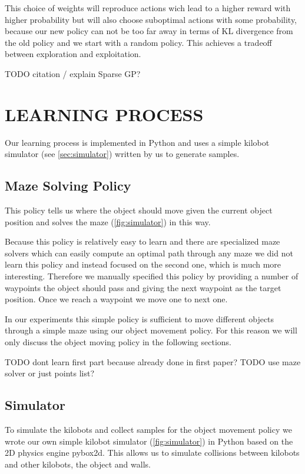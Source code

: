 \documentclass[twoside]{article}
\begin{document}
This choice of weights will reproduce actions wich lead to a higher reward with
higher probability but will also choose suboptimal actions with some
probability, because our new policy can not be too far away in terms of KL
divergence from the old policy and we start with a random policy. This achieves
a tradeoff between exploration and exploitation.

TODO citation / explain Sparse GP?

\section{LEARNING PROCESS}

Our learning process is implemented in Python and uses a simple kilobot
simulator (see \autoref{sec:simulator}) written by us to generate samples.

\subsection{Maze Solving Policy}
This policy tells us where the object should move given the current object
position and solves the maze (\autoref{fig:simulator}) in this way.

Because this policy is relatively easy to learn and there are specialized maze
solvers which can easily compute an optimal path through any maze we did not
learn this policy and instead focused on the second one, which is much more
interesting. Therefore we manually specified this policy by providing a number
of waypoints the object should pass and giving the next waypoint as the target
position. Once we reach a waypoint we move one to next one.

In our experiments this simple policy is sufficient to move different objects
through a simple maze using our object movement policy. For this reason we will
only discuss the object moving policy in the following sections.

TODO dont learn first part because already done in first paper?
TODO use maze solver or just points list?

\subsection{Simulator}
\label{sec:simulator}

\newcommand\nkb{\#\mathit{kb}}
\newcommand\nep{\#\mathit{ep}}
\newcommand\nst{\#\mathit{st}}

To simulate the kilobots and collect samples for the object movement policy we
wrote our own simple kilobot simulator (\autoref{fig:simulator}) in Python based
on the 2D physics engine pybox2d\cite{pybox2d}. This allows us to simulate
collisions between kilobots and other kilobots, the object and walls.
\end{document}
